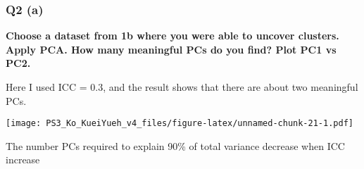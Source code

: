 \documentclass[]{article}
\newenvironment{Shaded}{\begin{snugshade}}{\end{snugshade}}
\newcommand{\KeywordTok}[1]{\textcolor[rgb]{0.13,0.29,0.53}{\textbf{#1}}}
\newcommand{\DecValTok}[1]{\textcolor[rgb]{0.00,0.00,0.81}{#1}}
\newcommand{\FloatTok}[1]{\textcolor[rgb]{0.00,0.00,0.81}{#1}}
\newcommand{\StringTok}[1]{\textcolor[rgb]{0.31,0.60,0.02}{#1}}
\newcommand{\CommentTok}[1]{\textcolor[rgb]{0.56,0.35,0.01}{\textit{#1}}}
\newcommand{\OperatorTok}[1]{\textcolor[rgb]{0.81,0.36,0.00}{\textbf{#1}}}
\newcommand{\NormalTok}[1]{#1}
\begin{document}
\begin{Shaded}
\begin{Highlighting}[]
{{{{{{    \KeywordTok{return}\NormalTok{(gp)}
\NormalTok{\} }\CommentTok{# end func}
\end{Highlighting}
\end{Shaded}

\subsubsection{Q2 (a)}\label{q2-a}

\textbf{Choose a dataset from 1b where you were able to uncover
clusters. Apply PCA. How many meaningful PCs do you find? Plot PC1 vs
PC2.}

Here I used ICC = 0.3, and the result shows that there are about two
meaningful PCs.

\begin{Shaded}
\end{Shaded}

\texttt{[image: PS3\_Ko\_KueiYueh\_v4\_files/figure-latex/unnamed-chunk-21-1.pdf]}

The number PCs required to explain 90\% of total variance decrease when
ICC increase
\end{document}
